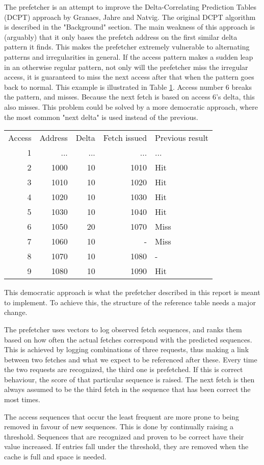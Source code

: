 

The prefetcher is an attempt to improve the Delta-Correlating Prediction Tables (DCPT) approach by Granaes, Jahre and Natvig. The original DCPT algorithm is described in the "Background" section. The main weakness of this approach is (arguably) that it only bases the prefetch address on the first similar delta pattern it finds. This makes the prefetcher extremely vulnerable to alternating patterns and irregularities in general. If the access pattern makes a sudden leap in an otherwise regular pattern, not only will the prefetcher miss the irregular access, it is guaranteed to miss the next access after that when the pattern goes back to normal. This example is illustrated in Table \ref{table:breakDCPT}. Access number 6 breaks the pattern, and misses. Because the next fetch is based on access 6's delta, this also misses. This problem could be solved by a more democratic approach, where the most common "next delta" is used instead of the previous.
\begin{table}
\label{table:breakDCPT}
\begin{tabular}{rrrrl}
Access & Address & Delta & Fetch issued & Previous result\\
1 & ... & ... & ... & ...\\
2 & 1000 & 10 & 1010 & Hit\\
3 & 1010 & 10 & 1020 & Hit\\
4 & 1020 & 10 & 1030 & Hit\\
5 & 1030 & 10 & 1040 & Hit\\
6 & 1050 & 20 & 1070 & Miss\\
7 & 1060 & 10 & - 	 & Miss\\
8 & 1070 & 10 & 1080 & -\\
9 & 1080 & 10 & 1090 & Hit
\end{tabular}
\end{table}

This democratic approach is what the prefetcher described in this report is meant to implement. To achieve this, the structure of the reference table needs a major change. 

The prefetcher uses vectors to log observed fetch sequences, and ranks them based on how often the actual fetches correspond with the predicted sequences. This is achieved by logging combinations of three requests, thus making a link between two fetches and what we expect to be referenced after these. Every time the two requests are recognized, the third one is prefetched. If this is correct behaviour, the score of that particular sequence is raised. The next fetch is then always assumed to be the third fetch in the sequence that has been correct the most times.

The access sequences that occur the least frequent are more prone to being removed in favour of new sequences. This is done by continually raising a threshold. Sequences that are recognized and proven to be correct have their value increased. If entries fall under the threshold, they are removed when the cache is full and space is needed.

